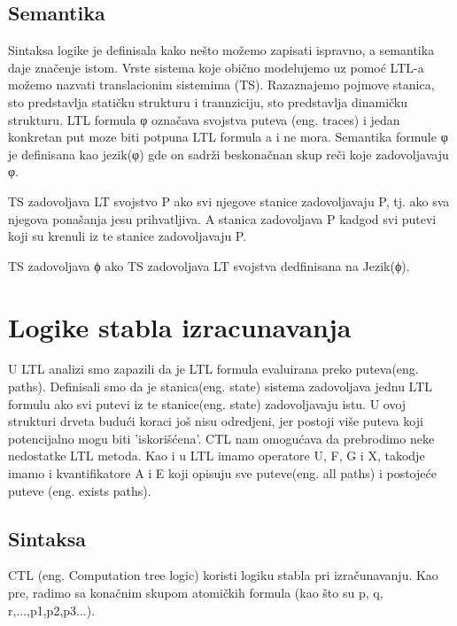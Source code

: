 \documentclass[a4paper]{article}
\begin{document}
{	\subsection{Semantika}
	\label{subsec:podnaslovN}
	\newline
	\newline
	Sintaksa logike je definisala kako nešto možemo zapisati ispravno, a semantika daje značenje istom.
	Vrste sistema koje obično modelujemo uz pomoć LTL-a možemo nazvati translacionim sistemima (TS). Razaznajemo pojmove stanica, sto predstavlja statičku strukturu i trannziciju, sto predstavlja dinamičku strukturu.
	LTL formula φ označava svojstva puteva (eng. traces) i jedan konkretan put moze biti potpuna LTL formula a i ne mora.
	Semantika formule φ je definisana kao jezik(φ) gde on sadrži beskonačnan skup reči koje zadovoljavaju φ.

	TS zadovoljava LT svojstvo P ako svi njegove stanice zadovoljavaju P, tj. ako sva njegova ponašanja jesu prihvatljiva. A stanica zadovoljava P kadgod svi putevi koji su krenuli iz te stanice zadovoljavaju P.

	TS zadovoljava ϕ ako TS zadovoljava LT svojstva dedfinisana na Jezik(ϕ).
	}

	\section{Logike stabla izracunavanja}
	\label{sec:CTL}
	\newline
	\newline
	U LTL analizi smo zapazili da je LTL formula evaluirana preko puteva(eng. paths). Definisali smo da je stanica(eng. state) sistema
	zadovoljava jednu LTL formulu ako svi putevi iz te stanice(eng. state) zadovoljavaju istu. U ovoj strukturi drveta budući koraci još nisu
	odredjeni, jer postoji više puteva koji potencijalno mogu biti 'iskorišćena'.
	CTL nam omogućava da prebrodimo neke nedostatke LTL metoda. Kao i u LTL imamo operatore U, F, G i X, takodje imamo i kvantifikatore
	A i E koji opisuju sve puteve(eng. all paths) i postojeće puteve (eng. exists paths). 
	\newline
	\newline
	\subsection{Sintaksa}
	\label{subsec:podnaslovN}
	\newline
	\newline
	CTL (eng. Computation tree logic) koristi logiku stabla pri izračunavanju. 
	Kao pre, radimo sa konačnim skupom atomičkih formula (kao što su p, q, r,...,p1,p2,p3...).
\end{document}
